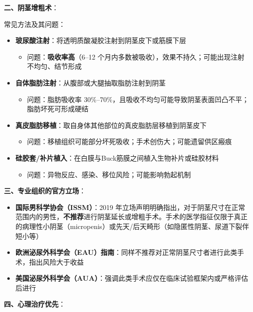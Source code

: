 \vspace{0.5em}
\noindent\textbf{二、阴茎增粗术}：

常见方法及其问题：
\begin{itemize}[leftmargin=2cm]
	\item \textbf{玻尿酸注射}：将透明质酸凝胶注射到阴茎皮下或筋膜下层
	\begin{itemize}
		\item 问题：\textbf{吸收率高}（6--12 个月内多数被吸收），效果不持久；可能出现注射不均匀、结节形成
	\end{itemize}
	\item \textbf{自体脂肪注射}：从腹部或大腿抽取脂肪注射到阴茎
	\begin{itemize}
		\item 问题：脂肪吸收率 30\%--70\%，且吸收不均匀可能导致阴茎表面凹凸不平；脂肪坏死可形成硬结
	\end{itemize}
	\item \textbf{真皮脂肪移植}：取自身体其他部位的真皮脂肪层移植到阴茎皮下
	\begin{itemize}
		\item 问题：移植组织可能部分坏死吸收；手术创伤大；可能遗留供区瘢痕
	\end{itemize}
	\item \textbf{硅胶套/补片植入}：在白膜与Buck筋膜之间植入生物补片或硅胶材料
	\begin{itemize}
		\item 问题：异物反应、感染、移位风险；可能影响勃起机制
	\end{itemize}
\end{itemize}

\vspace{0.5em}
\noindent\textbf{三、专业组织的官方立场}：

\begin{itemize}[leftmargin=2cm]
	\item \textbf{国际男科学协会（ISSM）}：2019 年立场声明明确指出，对于阴茎尺寸在正常范围内的男性，\textbf{不推荐}进行阴茎延长或增粗手术。手术的医学指征仅限于真正的病理性小阴茎（micropenis）或先天/后天畸形（如隐匿性阴茎、尿道下裂伴短小等）
	\item \textbf{欧洲泌尿外科学会（EAU）指南}：同样不推荐对正常阴茎尺寸者进行此类手术，指出风险大于收益
	\item \textbf{美国泌尿外科学会（AUA）}：强调此类手术应仅在临床试验框架内或严格评估后进行
\end{itemize}

\vspace{0.5em}
\noindent\textbf{四、心理治疗优先}：

